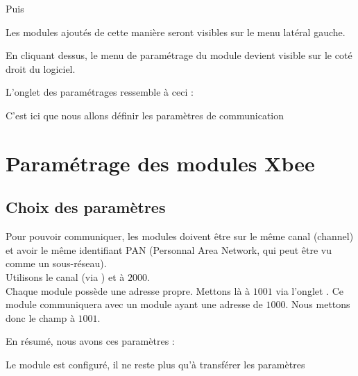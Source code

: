 {\begin{enumerate}
Puis 

Les modules ajoutés de cette manière seront visibles sur le menu latéral gauche.



En cliquant dessus, le menu de paramétrage du module devient visible sur le coté droit du logiciel.

L'onglet des paramétrages ressemble à ceci : 


C'est ici que nous allons définir les paramètres de communication 

\end{enumerate}

\label{xbee}
\section{Paramétrage des modules Xbee}

\subsection{Choix des paramètres}

Pour pouvoir communiquer, les modules doivent être sur le même canal (channel) et avoir le même identifiant PAN (Personnal Area Network, qui peut être vu comme un sous-réseau).\\


Utilisons le canal  (via ) et   à $2000$.\\
Chaque module possède une adresse propre. Mettons là à $1001$ via l'onglet .
Ce module communiquera avec un module ayant une adresse de $1000$.
 Nous mettons donc le champ  à $1001$.

En résumé, nous avons ces paramètres :






Le module est configuré, il ne reste plus qu'à transférer les paramètres

}

